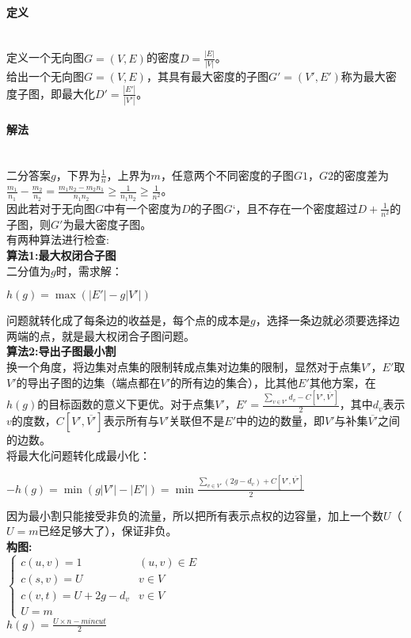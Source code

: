 \paragraph{定义}~{}
\\
定义一个无向图$G=(V, E)$的密度$D=\frac{|E|}{|V|}$。\\
给出一个无向图$G=(V, E)$，其具有最大密度的子图$G'=(V', E')$称为最大密度子图，即最大化$D'=\frac{|E'|}{|V'|}$。

\paragraph{解法}~{}
\\
二分答案$g$，下界为$\frac{1}{n}$，上界为$m$，任意两个不同密度的子图$G1$，$G2$的密度差为$\frac{m_1}{n_1} - \frac{m_2}{n_2} = \frac{m_1n_2-m_2n_1}{n_1n_2} \geq \frac{1}{n_1n_2}  \geq \frac{1}{n^2}$。\\
因此若对于无向图$G$中有一个密度为$D$的子图$G‘$，且不存在一个密度超过$D+ \frac{1}{n^2}$的子图，则$G'$为最大密度子图。\\
有两种算法进行检查:\\
\textbf{算法1:最大权闭合子图}\\
二分值为$g$时，需求解：
\begin{center}$h(g)= \max (|E'|-g|V'|)$\end{center}
问题就转化成了每条边的收益是，每个点的成本是$g$，选择一条边就必须要选择边两端的点，就是最大权闭合子图问题。\\
\textbf{算法2:导出子图最小割}\\
换一个角度，将边集对点集的限制转成点集对边集的限制，显然对于点集$V'$，$E'$取$V'$的导出子图的边集（端点都在$V'$的所有边的集合），比其他$E'$其他方案，在$h(g)$的目标函数的意义下更优。对于点集$V'$，$E'= \frac{\sum_{v \in V'}d_v - C[V', \overline{V'}]}{2}$，其中$d_v$表示$v$的度数，$C[V', \overline{V'}]$表示所有与$V'$关联但不是$E'$中的边的数量，即$V'$与补集$\overline{V'}$之间的边数。\\
将最大化问题转化成最小化：
\begin{center}$-h(g)=\min (g|V'|-|E'|)= \min \frac{\sum_{v \in V'}(2g-d_v) + C[V', \overline{V'}]}{2}$\end{center}
因为最小割只能接受非负的流量，所以把所有表示点权的边容量，加上一个数$U$（$U=m已经足够大了$），保证非负。\\
\textbf{构图:}\\
$
\begin{cases}
c(u, v)=1 & (u, v) \in E \\
c(s, v)=U & v \in V\\
c(v, t)=U+2g-d_v & v \in V\\
U=m
\end{cases}
$\\
$h(g)=\frac{U \times n - mincut}{2}$

